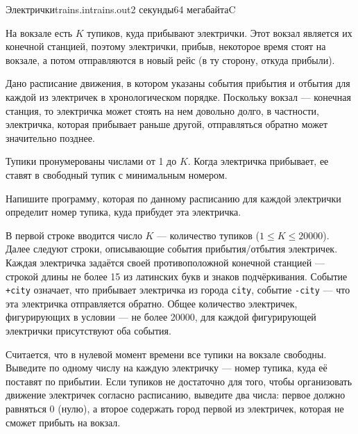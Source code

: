 \documentclass[12pt,a4paper,oneside,twocolumn,landscape]{article}
\begin{document}
\bigskip\bigskip
\begin{problem}{Электрички}{trains.in}{trains.out}{2 секунды}{64 мегабайта}{C}
\graphicspath{{.././trains/statements/}}
На вокзале есть $K$ тупиков, куда прибывают электрички. Этот вокзал является их конечной станцией, поэтому электрички, прибыв, некоторое время стоят на вокзале, а потом отправляются в новый рейс (в ту сторону, откуда прибыли).

Дано расписание движения, в котором указаны события прибытия и отбытия для каждой из электричек в хронологическом порядке. Поскольку вокзал --- конечная станция, то электричка может стоять на нем довольно долго, в частности, электричка, которая прибывает раньше другой, отправляться обратно может значительно позднее.

Тупики пронумерованы числами от 1 до $K$. Когда электричка прибывает, ее ставят в свободный тупик с минимальным номером. 

Напишите программу, которая по данному расписанию для каждой электрички определит номер тупика, куда прибудет эта электричка. 

\InputFile
В первой строке вводится число $K$ --- количество тупиков ($1 \leq K \leq 20000$). Далее следуют строки, описывающие события прибытия/отбытия электричек. Каждая электричка задаётся своей противоположной конечной станцией --- строкой длины не более 15 из латинских букв и знаков подчёркивания. Событие \verb"+city" означает, что прибывает электричка из города \verb"city", событие \verb"-city" --- что эта электричка отправляется обратно. Общее количество электричек, фигурирующих в условии --- не более 20000, для каждой фигурирующей электрички присутствуют оба события.

Считается, что в нулевой момент времени все тупики на вокзале свободны. 
\OutputFile
Выведите по одному числу на каждую электричку --- номер тупика, куда её поставят по прибытии. Если тупиков не достаточно для того, чтобы организовать движение электричек согласно расписанию,  выведите два числа: первое должно равняться 0 (нулю), а второе содержать город первой из электричек, которая не сможет прибыть на вокзал.


\Examples

\begin{example}
%
%
\end{example}


\end{problem}
\end{document}
